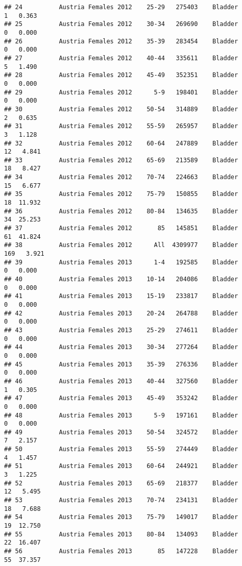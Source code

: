 \documentclass[
]{article}
\begin{document}
\begin{verbatim}
## 24          Austria Females 2012    25-29   275403    Bladder      1   0.363
## 25          Austria Females 2012    30-34   269690    Bladder      0   0.000
## 26          Austria Females 2012    35-39   283454    Bladder      0   0.000
## 27          Austria Females 2012    40-44   335611    Bladder      5   1.490
## 28          Austria Females 2012    45-49   352351    Bladder      0   0.000
## 29          Austria Females 2012      5-9   198401    Bladder      0   0.000
## 30          Austria Females 2012    50-54   314889    Bladder      2   0.635
## 31          Austria Females 2012    55-59   265957    Bladder      3   1.128
## 32          Austria Females 2012    60-64   247889    Bladder     12   4.841
## 33          Austria Females 2012    65-69   213589    Bladder     18   8.427
## 34          Austria Females 2012    70-74   224663    Bladder     15   6.677
## 35          Austria Females 2012    75-79   150855    Bladder     18  11.932
## 36          Austria Females 2012    80-84   134635    Bladder     34  25.253
## 37          Austria Females 2012       85   145851    Bladder     61  41.824
## 38          Austria Females 2012      All  4309977    Bladder    169   3.921
## 39          Austria Females 2013      1-4   192585    Bladder      0   0.000
## 40          Austria Females 2013    10-14   204086    Bladder      0   0.000
## 41          Austria Females 2013    15-19   233817    Bladder      0   0.000
## 42          Austria Females 2013    20-24   264788    Bladder      0   0.000
## 43          Austria Females 2013    25-29   274611    Bladder      0   0.000
## 44          Austria Females 2013    30-34   277264    Bladder      0   0.000
## 45          Austria Females 2013    35-39   276336    Bladder      0   0.000
## 46          Austria Females 2013    40-44   327560    Bladder      1   0.305
## 47          Austria Females 2013    45-49   353242    Bladder      0   0.000
## 48          Austria Females 2013      5-9   197161    Bladder      0   0.000
## 49          Austria Females 2013    50-54   324572    Bladder      7   2.157
## 50          Austria Females 2013    55-59   274449    Bladder      4   1.457
## 51          Austria Females 2013    60-64   244921    Bladder      3   1.225
## 52          Austria Females 2013    65-69   218377    Bladder     12   5.495
## 53          Austria Females 2013    70-74   234131    Bladder     18   7.688
## 54          Austria Females 2013    75-79   149017    Bladder     19  12.750
## 55          Austria Females 2013    80-84   134093    Bladder     22  16.407
## 56          Austria Females 2013       85   147228    Bladder     55  37.357

\end{verbatim}
\end{document}
